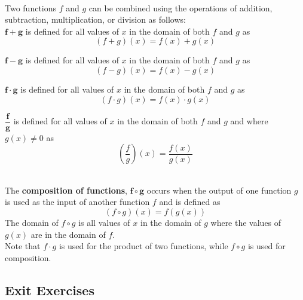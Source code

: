 \begin{myDefinition}~\\[0.5mm]
Two functions $f$ and $g$ can be combined using the operations of addition, subtraction, multiplication, or division as follows:\\

$\boldsymbol{f+g}$ is defined for all values of $x$ in the domain of both $f$ and $g$ as \[(f+g)(x) = f(x)+g(x) \]

$\boldsymbol{f-g}$ is defined for all values of $x$ in the domain of both $f$ and $g$ as \[(f-g)(x) = f(x)-g(x) \]

$\boldsymbol{f\cdot g}$ is defined for all values of $x$ in the domain of both $f$ and $g$ as \[(f\cdot g)(x) = f(x) \cdot g(x) \]

$\boldsymbol{\dfrac{f}{g}}$ is defined for all values of $x$ in the domain of both $f$ and $g$ and where $g(x)\neq0$  as \[\left(\dfrac{f}{g}\right)(x) = \dfrac{f(x)}{g(x)} \]


\end{myDefinition}

\begin{myDefinition}~\\[0.5mm]
The {\bf composition of functions}, $\boldsymbol{f\circ g}$ occurs when the output of one function $g$ is used as the input of another function $f$ and is defined as
\[ (f \circ g) (x) = f(g(x))\]
The domain of $f\circ g$ is all values of $x$ in the domain of $g$ where the values of $g(x)$ are in the domain of $f$.\\

Note that $f\cdot g$ is used for the product of two functions, while $f \circ g$ is used for composition.
\end{myDefinition}




 \newpage

\subsection*{Exit Exercises     } \label{exit-functions-algebra-and-composition}



